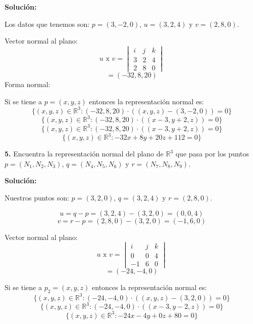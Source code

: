 \documentclass{article}
\begin{document}
\textbf{Solución:}
\vspace*{10pt}

Los datos que tenemos son: $p = (3, -2, 0)$, $u = (3, 2, 4)$ y $v = (2, 8, 0)$.

Vector normal al plano:
$$u \text{ x } v = \begin{vmatrix}
    i & j & k \\
    3 & 2 & 4\\
    2 & 8 & 0
\end{vmatrix}$$
$$= (-32, 8, 20)$$
Forma normal:

Si se tiene a $p =(x,y,z)$ entonces la representación normal es:
$$\{(x,y,z) \in \mathbb{R}^3: (-32, 8, 20)\cdot((x,y,z)-(3,-2,0)) = 0\}$$
$$\{(x,y,z) \in \mathbb{R}^3: (-32, 8, 20)\cdot((x-3,y+2,z)) = 0\}$$
$$\{(x,y,z) \in \mathbb{R}^3: (-32, 8, 20)\cdot((x-3,y+2,z)) = 0\}$$
$$\{(x,y,z) \in \mathbb{R}^3: -32x+8y+20z+112 = 0\}$$
\vspace{10pt}

\textbf{5.} Encuentra la representación normal del plano de $\mathbb{R}^3$ que pasa por los puntos 
$p = (N_1, N_2, N_3)$, $q = (N_4,N_5,N_6)$ y $r = (N_7,N_8,N_9)$.
\vspace{10pt}

\textbf{Solución:}
\vspace{10pt}

Nuestros puntos son: $p = (3, 2, 0)$, $q = (3,2,4)$ y $r = (2,8,0)$.

$$u = q-p =(3,2,4)-(3,2,0) =(0,0, 4)$$
$$v = r -p =(2,8,0)- (3,2,0) =(-1,6,0)$$

Vector normal al plano:
$$u \text{ x } v = \begin{vmatrix}
    i & j & k \\
    0 & 0 & 4 \\
    -1 & 6 & 0
\end{vmatrix}$$
$$=(-24, -4, 0)$$

Si se tiene a $p_2 =(x,y,z)$ entonces la representación normal es:
$$\{(x,y,z) \in \mathbb{R}^3: (-24,-4,0)\cdot((x,y,z)-(3,2,0)) = 0\}$$
$$\{(x,y,z) \in \mathbb{R}^3: (-24,-4,0)\cdot((x-3,y-2,z)) = 0\}$$
$$\{(x,y,z) \in \mathbb{R}^3: -24x-4y+0z+80 = 0\}$$
\end{document}
